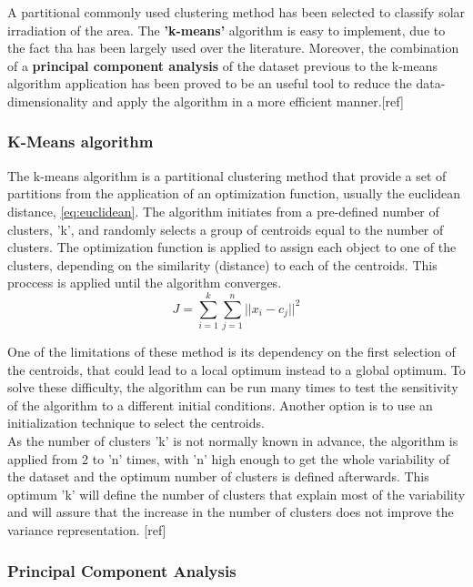 A partitional commonly used clustering method has been selected to classify solar irradiation of the area. The \textbf{'k-means'} algorithm is easy to implement, due to the fact tha has been largely used over the literature. Moreover, the combination of a \textbf{principal component analysis} of the dataset previous to the k-means algorithm application has been proved to be an useful tool to reduce the data-dimensionality and apply the algorithm in a more efficient manner.[ref]

\subsubsection{K-Means algorithm}

The k-means algorithm is a partitional clustering method that provide a set of partitions from the application of an optimization function, usually the euclidean distance, \ref{eq:euclidean}. The algorithm initiates from a pre-defined number of clusters, 'k', and randomly selects a group of centroids equal to the number of clusters. The optimization function is applied to assign each object to one of the clusters, depending on the similarity (distance) to each of the centroids. This proccess is applied until the algorithm converges.\\

\begin{equation}\label{eq:euclidean}
    J =\sum_{i=1}^{k}\sum_{j=1}^{n}{||x_i-c_j||}^2
\end{equation}

One of the limitations of these method is its dependency on the first selection of the centroids, that could lead to a local optimum instead to a global optimum. To solve these difficulty, the algorithm can be run many times to test the sensitivity of the algorithm to a different initial conditions. Another option is to use an initialization technique to select the centroids.\\

As the number of clusters 'k' is not normally known in advance, the algorithm is applied from 2 to 'n' times, with 'n' high enough to get the whole variability of the dataset and the optimum number of clusters is defined afterwards. This optimum 'k' will define the number of clusters that explain most of the variability and will assure that the increase in the number of clusters does not improve the variance representation. [ref]\\

\subsubsection{Principal Component Analysis}

